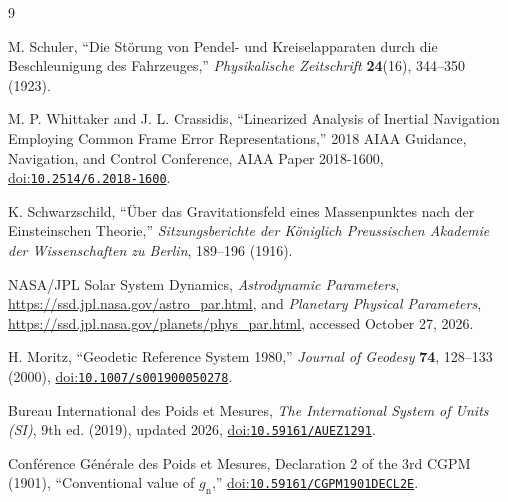 \documentclass[12pt]{article}
\begin{document}
\begin{thebibliography}{9}
\small
{}
\raggedright
{}

M. Schuler,
``Die St\"orung von Pendel- und Kreiselapparaten durch die Beschleunigung des Fahrzeuges,''
\emph{Physikalische Zeitschrift} \textbf{24}(16), 344--350 (1923).

M. P. Whittaker and J. L. Crassidis,
``Linearized Analysis of Inertial Navigation Employing Common Frame Error Representations,''
2018 AIAA Guidance, Navigation, and Control Conference,
AIAA Paper 2018-1600,
\href{https://doi.org/10.2514/6.2018-1600}{doi:\nolinkurl{10.2514/6.2018-1600}}.

K. Schwarzschild,
``\"Uber das Gravitationsfeld eines Massenpunktes nach der Einsteinschen Theorie,''
\emph{Sitzungsberichte der K\"oniglich Preussischen Akademie der Wissenschaften zu Berlin}, 189--196 (1916).

NASA/JPL Solar System Dynamics,
\emph{Astrodynamic Parameters},
\url{https://ssd.jpl.nasa.gov/astro_par.html}, and
\emph{Planetary Physical Parameters},
\url{https://ssd.jpl.nasa.gov/planets/phys_par.html},
accessed October 27, 2026.

H. Moritz,
``Geodetic Reference System 1980,''
\emph{Journal of Geodesy} \textbf{74}, 128--133 (2000),
\href{https://doi.org/10.1007/s001900050278}{doi:\nolinkurl{10.1007/s001900050278}}.

Bureau International des Poids et Mesures,
\emph{The International System of Units (SI)}, 9th ed. (2019), updated 2026,
\href{https://doi.org/10.59161/AUEZ1291}{doi:\nolinkurl{10.59161/AUEZ1291}}.

Conf\'erence G\'en\'erale des Poids et Mesures,
Declaration 2 of the 3rd CGPM (1901), ``Conventional value of $g_{\mathrm{n}}$,''
\href{https://doi.org/10.59161/CGPM1901DECL2E}{doi:\nolinkurl{10.59161/CGPM1901DECL2E}}.

\end{thebibliography}
\end{document}
